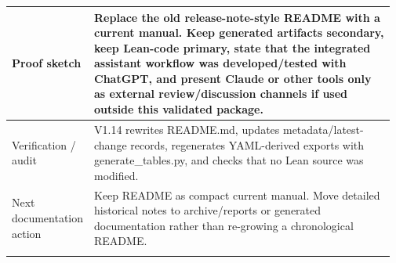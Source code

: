 \begin{longtable}{L{0.16\linewidth} L{0.81\linewidth}}
\hline\addlinespace[0.20em]
Proof sketch & Replace the old release-note-style README with a current manual. Keep generated artifacts secondary, keep Lean-code primary, state that the integrated assistant workflow was developed/\allowbreak{}tested with ChatGPT, and present Claude or other tools only as external review/\allowbreak{}discussion channels if used outside this validated package.\\
\hline\addlinespace[0.20em]
Verification /\allowbreak{} audit & V1.14 rewrites README.md, updates metadata/\allowbreak{}latest-change records, regenerates YAML-derived exports with generate\_tables.py, and checks that no Lean source was modified.\\
\hline\addlinespace[0.20em]
Next documentation action & Keep README as compact current manual. Move detailed historical notes to archive/\allowbreak{}reports or generated documentation rather than re-growing a chronological README.\\
\hline\addlinespace[0.20em]
\end{longtable}
